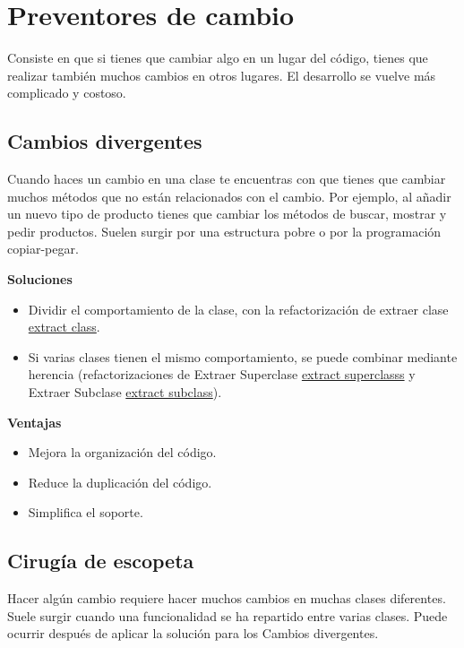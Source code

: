 \documentclass[11pt,a4paper,oneside]{book}
\begin{document}

\section{Preventores de cambio}

Consiste en que si tienes que cambiar algo en un lugar del código, tienes que realizar también muchos cambios en otros lugares. El desarrollo se vuelve más complicado y costoso.

\subsection{Cambios divergentes}
\label{cambiosdivergentes}
Cuando haces un cambio en una clase te encuentras con que tienes que cambiar muchos métodos que no están relacionados con el cambio. Por ejemplo, al añadir un nuevo tipo de producto tienes que cambiar los métodos de buscar, mostrar y pedir productos.
\newline
Suelen surgir por una estructura pobre o por la programación copiar-pegar.

\textbf{Soluciones}
\begin{itemize}
    \item Dividir el comportamiento de la clase, con la refactorización de extraer clase  \hyperref[extractclass]{extract class}.
    \item Si varias clases tienen el mismo comportamiento, se puede combinar mediante herencia (refactorizaciones de Extraer Superclase \hyperref[extractsuperclass]{extract superclasss} y Extraer Subclase \hyperref[extractsubclass]{extract subclass}).
\end{itemize} 

\textbf{Ventajas}
\begin{itemize}
    \item Mejora la organización del código.
    \item Reduce la duplicación del código.
    \item Simplifica el soporte.
\end{itemize}

\subsection{Cirugía de escopeta}
Hacer algún cambio requiere hacer muchos cambios en muchas clases diferentes.
\newline
Suele surgir cuando una funcionalidad se ha repartido entre varias clases. Puede ocurrir después de aplicar la solución para los Cambios divergentes.
\end{document}
